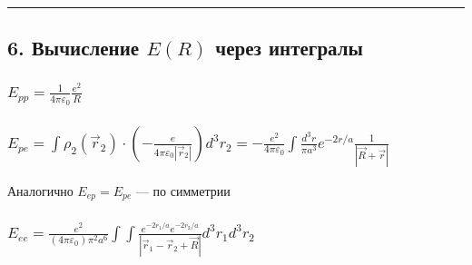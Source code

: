 \documentclass[11pt]{article}
\begin{document}
\begin{center}\rule{0.5\linewidth}{\linethickness}\end{center}

\subsection{\texorpdfstring{6. Вычисление \(E(R)\) через
интегралы}{6. Вычисление E(R) через интегралы}}\label{ux432ux44bux447ux438ux441ux43bux435ux43dux438ux435-er-ux447ux435ux440ux435ux437-ux438ux43dux442ux435ux433ux440ux430ux43bux44b}

\subsubsection{\texorpdfstring{\(E_{pp} = \frac{1}{4\pi\varepsilon_0} \frac{e^2}{R}\)}{E\_\{pp\} = \textbackslash{}frac\{1\}\{4\textbackslash{}pi\textbackslash{}varepsilon\_0\} \textbackslash{}frac\{e\^{}2\}\{R\}}}\label{e_pp-frac14pivarepsilon_0-frace2r}

\subsubsection{\texorpdfstring{\(E_{pe} = \int \rho_2(\vec{r}_2) \cdot \left( -\frac{e}{4\pi\varepsilon_0 |\vec{r}_2|} \right) d^3r_2 = -\frac{e^2}{4\pi\varepsilon_0} \int \frac{d^3r}{\pi a^3} e^{-2r/a} \frac{1}{|\vec{R} + \vec{r}|}\)}{E\_\{pe\} = \textbackslash{}int \textbackslash{}rho\_2(\textbackslash{}vec\{r\}\_2) \textbackslash{}cdot \textbackslash{}left( -\textbackslash{}frac\{e\}\{4\textbackslash{}pi\textbackslash{}varepsilon\_0 \textbar{}\textbackslash{}vec\{r\}\_2\textbar{}\} \textbackslash{}right) d\^{}3r\_2 = -\textbackslash{}frac\{e\^{}2\}\{4\textbackslash{}pi\textbackslash{}varepsilon\_0\} \textbackslash{}int \textbackslash{}frac\{d\^{}3r\}\{\textbackslash{}pi a\^{}3\} e\^{}\{-2r/a\} \textbackslash{}frac\{1\}\{\textbar{}\textbackslash{}vec\{R\} + \textbackslash{}vec\{r\}\textbar{}\}}}\label{e_pe-int-rho_2vecr_2-cdot-left--frace4pivarepsilon_0-vecr_2-right-d3r_2--frace24pivarepsilon_0-int-fracd3rpi-a3-e-2ra-frac1vecr-vecr}

Аналогично \(E_{ep} = E_{pe}\) --- по симметрии

\subsubsection{\texorpdfstring{\(E_{ee} = \frac{e^2}{(4\pi\varepsilon_0) \pi^2 a^6} \int \int \frac{ e^{-2r_1/a} e^{-2r_2/a} }{ |\vec{r}_1 - \vec{r}_2 + \vec{R}| } d^3r_1 d^3r_2\)}{E\_\{ee\} = \textbackslash{}frac\{e\^{}2\}\{(4\textbackslash{}pi\textbackslash{}varepsilon\_0) \textbackslash{}pi\^{}2 a\^{}6\} \textbackslash{}int \textbackslash{}int \textbackslash{}frac\{ e\^{}\{-2r\_1/a\} e\^{}\{-2r\_2/a\} \}\{ \textbar{}\textbackslash{}vec\{r\}\_1 - \textbackslash{}vec\{r\}\_2 + \textbackslash{}vec\{R\}\textbar{} \} d\^{}3r\_1 d\^{}3r\_2}}\label{e_ee-frace24pivarepsilon_0-pi2-a6-int-int-frac-e-2r_1a-e-2r_2a-vecr_1---vecr_2-vecr-d3r_1-d3r_2}
\end{document}

